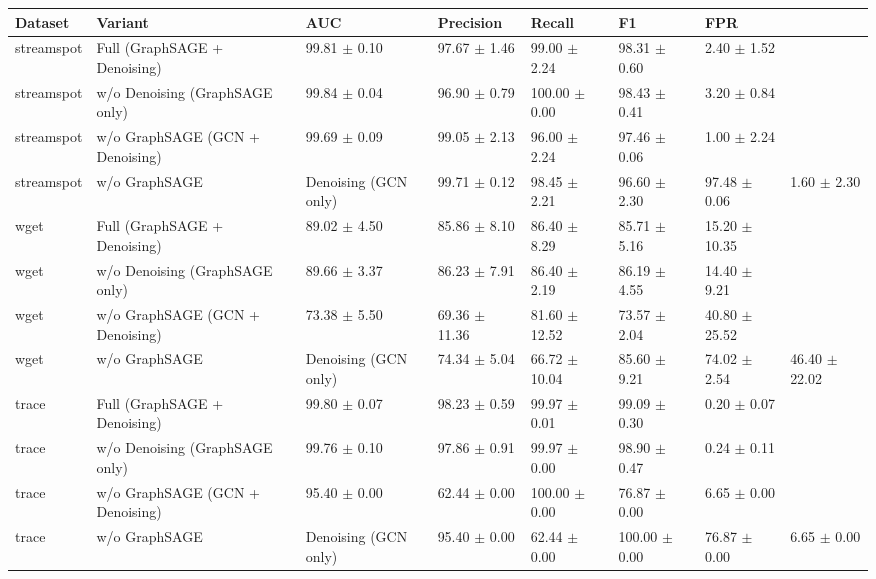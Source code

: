 \begin{tabular}{lllllll}
\toprule
Dataset & Variant & AUC & Precision & Recall & F1 & FPR \\
\midrule
streamspot & Full (GraphSAGE + Denoising) & 99.81 $\pm$ 0.10 & 97.67 $\pm$ 1.46 & 99.00 $\pm$ 2.24 & 98.31 $\pm$ 0.60 & 2.40 $\pm$ 1.52 \\
streamspot & w/o Denoising (GraphSAGE only) & 99.84 $\pm$ 0.04 & 96.90 $\pm$ 0.79 & 100.00 $\pm$ 0.00 & 98.43 $\pm$ 0.41 & 3.20 $\pm$ 0.84 \\
streamspot & w/o GraphSAGE (GCN + Denoising) & 99.69 $\pm$ 0.09 & 99.05 $\pm$ 2.13 & 96.00 $\pm$ 2.24 & 97.46 $\pm$ 0.06 & 1.00 $\pm$ 2.24 \\
streamspot & w/o GraphSAGE & Denoising (GCN only) & 99.71 $\pm$ 0.12 & 98.45 $\pm$ 2.21 & 96.60 $\pm$ 2.30 & 97.48 $\pm$ 0.06 & 1.60 $\pm$ 2.30 \\
wget & Full (GraphSAGE + Denoising) & 89.02 $\pm$ 4.50 & 85.86 $\pm$ 8.10 & 86.40 $\pm$ 8.29 & 85.71 $\pm$ 5.16 & 15.20 $\pm$ 10.35 \\
wget & w/o Denoising (GraphSAGE only) & 89.66 $\pm$ 3.37 & 86.23 $\pm$ 7.91 & 86.40 $\pm$ 2.19 & 86.19 $\pm$ 4.55 & 14.40 $\pm$ 9.21 \\
wget & w/o GraphSAGE (GCN + Denoising) & 73.38 $\pm$ 5.50 & 69.36 $\pm$ 11.36 & 81.60 $\pm$ 12.52 & 73.57 $\pm$ 2.04 & 40.80 $\pm$ 25.52 \\
wget & w/o GraphSAGE & Denoising (GCN only) & 74.34 $\pm$ 5.04 & 66.72 $\pm$ 10.04 & 85.60 $\pm$ 9.21 & 74.02 $\pm$ 2.54 & 46.40 $\pm$ 22.02 \\
trace & Full (GraphSAGE + Denoising) & 99.80 $\pm$ 0.07 & 98.23 $\pm$ 0.59 & 99.97 $\pm$ 0.01 & 99.09 $\pm$ 0.30 & 0.20 $\pm$ 0.07 \\
trace & w/o Denoising (GraphSAGE only) & 99.76 $\pm$ 0.10 & 97.86 $\pm$ 0.91 & 99.97 $\pm$ 0.00 & 98.90 $\pm$ 0.47 & 0.24 $\pm$ 0.11 \\
trace & w/o GraphSAGE (GCN + Denoising) & 95.40 $\pm$ 0.00 & 62.44 $\pm$ 0.00 & 100.00 $\pm$ 0.00 & 76.87 $\pm$ 0.00 & 6.65 $\pm$ 0.00 \\
trace & w/o GraphSAGE & Denoising (GCN only) & 95.40 $\pm$ 0.00 & 62.44 $\pm$ 0.00 & 100.00 $\pm$ 0.00 & 76.87 $\pm$ 0.00 & 6.65 $\pm$ 0.00 \\
\bottomrule
\end{tabular}
